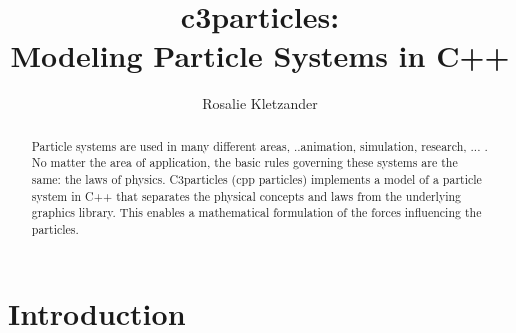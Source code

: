 \documentclass[runningheads,a4paper]{llncs}
\begin{document}
\mainmatter  %

\title{c3particles: \\ Modeling Particle Systems in C++}


%
\author{Rosalie Kletzander}
%


\maketitle


\begin{abstract}
Particle systems are used in many different areas, ..animation, simulation, research, ... .
 No matter the area of application, the basic rules governing these systems are the same: the laws of physics. C3particles (cpp particles) implements a model of a particle system in C++ that separates the physical concepts and laws from the underlying graphics library. This enables a mathematical formulation of the forces influencing the particles.

\end{abstract}


\section{Introduction}

%







\end{document}
